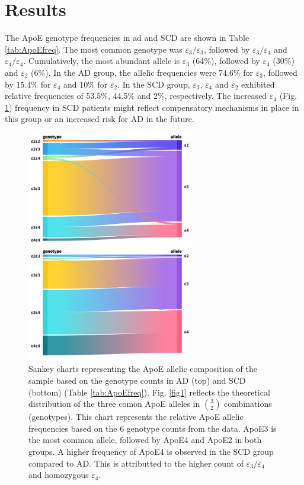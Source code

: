 \documentclass{amsart}
\begin{document}
\section{Results} \label{results}
The ApoE genotype frequencies in \acrshort{ad} and SCD are shown in Table \ref{tab:ApoEfreq}. The most common genotype was $\varepsilon_3/\varepsilon_3$, followed by $\varepsilon_3/\varepsilon_4$ and $\varepsilon_4/\varepsilon_4$. Cumulatively, the most abundant allele is $\varepsilon_3$ (64\%), followed by $\varepsilon_4$ (30\%) and $\varepsilon_2$ (6\%). In the AD group, the allelic frequencies were 74.6\% for $\varepsilon_3$, followed by 15.4\% for $\varepsilon_4$ and 10\% for $\varepsilon_2$. In the SCD group, $\varepsilon_3$, $\varepsilon_4$ and $\varepsilon_2$ exhibited relative frequencies of 53.5\%, 44.5\% and 2\%, respectively. The increased $\varepsilon_4$ (Fig. \ref{plot:sankey}) frequency in SCD patients might reflect compensatory mechanisms in place in this group or an increased risk for AD in the future.
\begin{figure}[H]
  \includegraphics[width=0.65\textwidth]{figures/sankey@2x.png}
    \caption{\label{plot:sankey} Sankey charts representing the ApoE allelic composition of the sample based on the genotype counts in AD (top) and SCD (bottom) (Table \ref{tab:ApoEfreq}). Fig. \ref{fig1} reflects the theoretical distribution of the three comon ApoE alleles in $\binom{3}{2}$ combinations (genotypes). This chart represents the relative ApoE allelic frequencies based on the 6 genotype counts from the data. ApoE3 is the most common allele, followed by ApoE4 and ApoE2 in both groups. A higher frequency of ApoE4 is observed in the SCD group compared to AD. This is attributted to the higher count of $\varepsilon_3/\varepsilon_4$ and homozygous $\varepsilon_4$.}
\end{figure}
\end{document}
